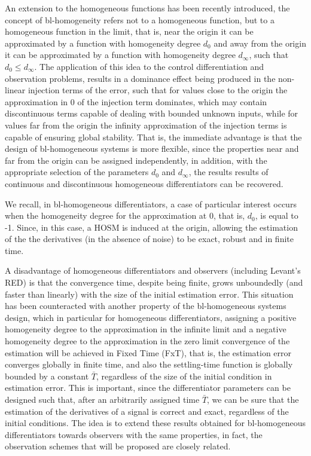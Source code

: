 \documentclass[11pt,letterpaper,twoside,openright]{report}
\begin{document}
An extension to the homogeneous functions has been recently introduced, the concept of bl-homogeneity refers not to a homogeneous function, but to a homogeneous function in the limit\cite{Andrieu2008}, that is, near the origin it can be approximated by a function with homogeneity degree $d_0$ and away from the origin it can be approximated by a function with homogeneity degree $d_{\infty}$, such that $d_0 \leq d_{\infty}$. The application of this idea to the control \cite{CruzZavala2021} differentiation\cite{Moreno2021} and observation problems, results in a dominance effect being produced in the non-linear injection terms of the error, such that for values close to the origin the approximation in 0 of the injection term dominates, which may contain discontinuous terms capable of dealing with bounded unknown inputs, while for values far from the origin the infinity approximation of the injection terms is capable of ensuring global stability. That is, the immediate advantage is that the design of bl-homogeneous systems is more flexible, since the properties near and far from the origin can be assigned independently, in addition, with the appropriate selection of the parameters $d_0$ and $d_\infty$, the results results of continuous and discontinuous homogeneous differentiators can be recovered.

We recall, in bl-homogeneous differentiators, a case of particular interest occurs when the homogeneity degree for the approximation at 0, that is, $d_0$, is equal to -1. Since, in this case, a HOSM is induced at the origin, allowing the estimation of the  the derivatives (in the absence of noise) to be exact, robust and in finite time\cite{Moreno2021}.

A disadvantage of homogeneous differentiators and observers (including Levant's RED) is that the convergence time, despite being finite, grows unboundedly (and faster than linearly) with the size of the initial estimation error\cite{Moreno2021}. This situation has been counteracted with another property of the bl-homogeneous systems design, which in particular for homogeneous differentiators, assigning a positive homogeneity degree to the approximation in the infinite limit and a negative homogeneity degree to the approximation in the zero limit convergence of the estimation will be achieved in Fixed Time (FxT), that is, the estimation error converges globally in finite time, and also the settling-time function is globally bounded by a constant $\bar{T}$, regardless of the size of the initial condition in estimation error. This is important, since the differentiator parameters can be designed such that, after an arbitrarily assigned time $\bar{T}$, we can be sure that the estimation of the derivatives of a signal is correct and exact, regardless of the initial conditions. The idea is to extend these results obtained for bl-homogeneous differentiators towards observers with the same properties, in fact, the observation schemes that will be proposed are closely related.
\end{document}
